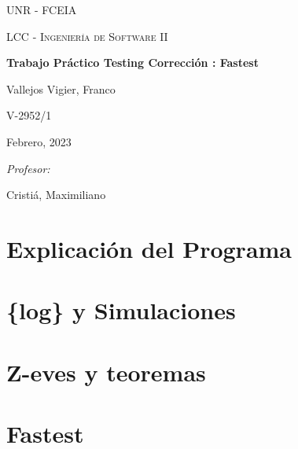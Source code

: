 \documentclass[a4paper, 12pt,left = 0.3mm british, oneside]{memoir}
\begin{document}
    \begin{titlepage}
	\centering
	{\scshape\LARGE UNR - FCEIA \par}
	\vspace{1cm}
	{\scshape\Large LCC - Ingeniería de Software II\par}
	\vspace{1.5cm}
	{\Huge\bfseries Trabajo Práctico Testing Corrección : Fastest \par}
	\vspace{2cm}
	{\Large\itshap Vallejos Vigier, Franco\par}
	\vspace{0.2cm}
	{\Large\itshap V-2952/1\par}
	\vspace{1cm}
	{Febrero, 2023}
	\vfill
    {\Large\itshape Profesor:\par}
	Cristiá, Maximiliano\par
	\vfill
    \frontmatter 
\end{titlepage}
    

    \cleartorecto
    \tableofcontents   
    \mainmatter      
    \chapter{Explicación del Programa}
    
    \chapter{\{log\} y Simulaciones}
    
    \chapter{Z-eves y teoremas}
    
    \chapter{Fastest}
    
\end{document}
